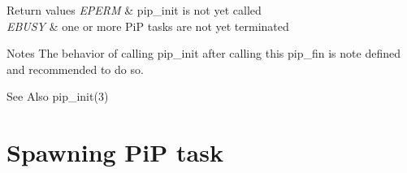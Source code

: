 \documentclass[twoside]{book}
\begin{document}
\begin{DoxyRetVals}{Return values}
{\em E\-P\-E\-R\-M} & {\ttfamily pip\-\_\-init} is not yet called \\
\hline
{\em E\-B\-U\-S\-Y} & {\ttfamily one} or more Pi\-P tasks are not yet terminated\\
\hline
\end{DoxyRetVals}
\begin{DoxyParagraph}{Notes}
The behavior of calling {\ttfamily pip\-\_\-init} after calling this {\ttfamily pip\-\_\-fin} is note defined and recommended to do so.
\end{DoxyParagraph}
\par
\par
\begin{DoxySeeAlso}{See Also}
pip\-\_\-init(3) 
\end{DoxySeeAlso}
 \hypertarget{group__pip-1-spawn}{\section{Spawning Pi\-P task}
\label{group__pip-1-spawn}
}
\end{document}
